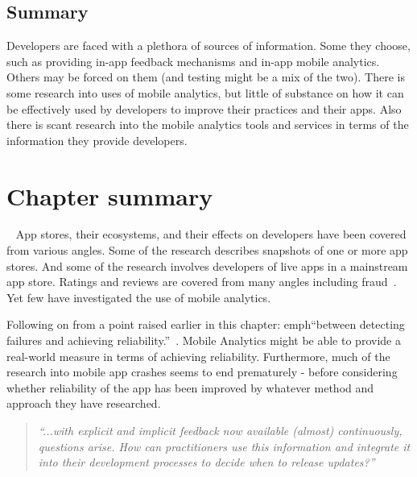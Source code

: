 \subsection{Summary} %
Developers are faced with a plethora of sources of information. Some they choose, such as providing in-app feedback mechanisms and in-app mobile analytics. Others may be forced on them (and testing might be a mix of the two). There is some research into uses of mobile analytics, but little of substance on how it can be effectively used by developers to improve their practices and their apps. Also there is scant research into the mobile analytics tools and services in terms of the information they provide developers. 

\section{Chapter summary}~\label{rw-summary-section}
App stores, their ecosystems, and their effects on developers have been covered from various angles. Some of the research describes snapshots of one or more app stores. And some of the research involves developers of live apps in a mainstream app store. Ratings and reviews are covered from many angles including fraud~. Yet few have investigated the use of mobile analytics.

Following on from a point raised earlier in this chapter: emph{``between detecting failures and achieving reliability.''}~. Mobile Analytics might be able to provide a real-world measure in terms of achieving reliability. Furthermore, much of the research into mobile app crashes seems to end prematurely - before considering whether reliability of the app has been improved by whatever method and approach they have researched.

\begin{quote}
    \emph{``...with explicit and implicit feedback now available (almost) continuously, questions arise. How can practitioners use this information and integrate it into their development processes to decide when to release updates?''}    
\end{quote}

